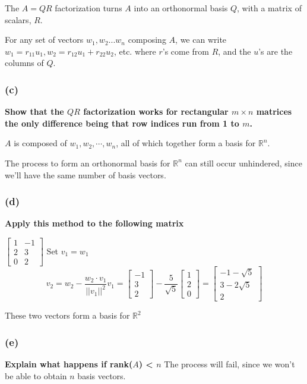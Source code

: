 \documentclass[10pt,letterpaper]{article}
\begin{document}
	The $A = QR$ factorization turns $A$ into an orthonormal basis $Q$, with a matrix of scalars, $R$. 
	
	For any set of vectors $w_1,w_2... w_n$ composing $A$, we can write $w_1 = r_{11} u_1, w_2 = r_{12} u_1 + r_{22} u_2$, etc. where $r$'s come from $R$, and the $u$'s are the columns of $Q$. 
	
	\subsubsection*{(c)} \textbf{Show that the $QR$ factorization works for rectangular $m \times n$ matrices the only difference being that row indices run from 1 to $m$.}
	
	$A$ is composed of $w_1,w_2,\cdots,w_n$, all of which together form a basis for $\mathbb{R}^n$.
	
	The process to form an orthonormal basis for $\mathbb{R}^n$ can still occur unhindered, since we'll have the same number of basis vectors. 
	
	\subsubsection*{(d)} \textbf{Apply this method to the following matrix}
	
    $\begin{bmatrix}
	1 & -1 \\ 2 & 3 \\ 0 & 2
	\end{bmatrix}$
	Set $v_1 = w_1$ 
	$$
	v_2 = w_2 - \frac{w_2 \cdot v_1}{||v_1||^2} v_1 = \begin{bmatrix}
	-1 \\ 3 \\ 2
	\end{bmatrix} - \frac{5}{\sqrt{5}} \begin{bmatrix}
	1 \\ 2 \\ 0
	\end{bmatrix} = \begin{bmatrix}
	-1 - \sqrt{5} \\ 3 - 2 \sqrt{5} \\ 2
	\end{bmatrix} 
	$$
	
	These two vectors form a basis for $\mathbb{R}^2$
	
	\subsubsection*{(e)} \textbf{Explain what happens if rank($A$) < $n$}
	The process will fail, since we won't be able to obtain $n$ basis vectors. 
	
\end{document}
